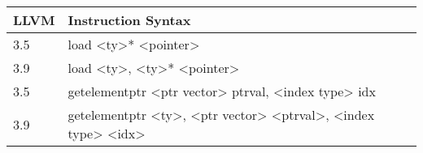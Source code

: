 \centering
\small
\begin{tabularx}{\columnwidth}{ll}
\toprule
LLVM & Instruction Syntax\\
\midrule
3.5 & load <ty>* <pointer> \\
3.9 & load <ty>, <ty>* <pointer> \\
3.5 & getelementptr <ptr vector> ptrval, <index type> idx \\
3.9 & getelementptr <ty>, <ptr vector> <ptrval>, <index type> <idx> \\
\bottomrule
\end{tabularx}